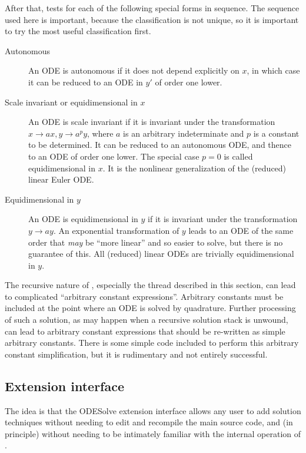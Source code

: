 After that,  tests for each of the following special
forms in sequence.  The sequence used here is important, because the
classification is not unique, so it is important to try the most
useful classification first.
\begin{description}
\item[Autonomous] An ODE is autonomous if it does not depend
explicitly on $x$, in which case it can be reduced to an ODE in $y'$
of order one lower.

\item[Scale invariant or equidimensional in $x$] An ODE is scale
invariant if it is invariant under the transformation $x \to ax, y \to
a^py$, where $a$ is an arbitrary indeterminate and $p$ is a constant
to be determined.  It can be reduced to an autonomous ODE, and thence
to an ODE of order one lower.  The special case $p = 0$ is called
equidimensional in $x$.  It is the nonlinear generalization of the
(reduced) linear Euler ODE.

\item[Equidimensional in $y$] An ODE is equidimensional in $y$ if it
is invariant under the transformation $y \to ay$.  An exponential
transformation of $y$ leads to an ODE of the same order that
\emph{may} be ``more linear'' and so easier to solve, but there is no
guarantee of this.  All (reduced) linear ODEs are trivially
equidimensional in $y$.
\end{description}

The recursive nature of , especially the thread described
in this section, can lead to complicated ``arbitrary constant
expressions''.  Arbitrary constants must be included at the point
where an ODE is solved by quadrature.  Further processing of such a
solution, as may happen when a recursive solution stack is unwound,
can lead to arbitrary constant expressions that should be re-written
as simple arbitrary constants.  There is some simple code included to
perform this arbitrary constant simplification, but it is rudimentary
and not entirely successful.


\subsection{Extension interface}\label{OEI}

The idea is that the ODESolve extension interface allows any user to
add solution techniques without needing to edit and recompile the main
source code, and (in principle) without needing to be intimately
familiar with the internal operation of .

